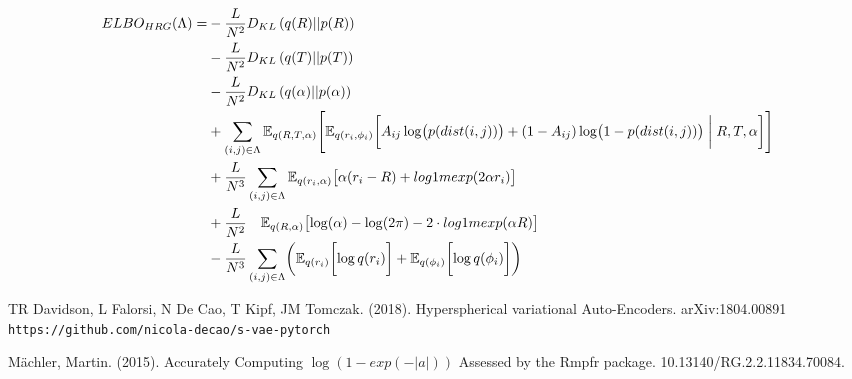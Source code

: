 \documentclass{article}
\newcommand{\E}{\mathbb{E}}
\begin{document}
\begin{equation}
\begin{split}
ELBO_{HRG}(\Lambda) = &- \frac{L}{N^2} D_{KL} \left(q(R)||p(R)\right)\\
\quad &- \frac{L}{N^2} D_{KL} \left(q(T)||p(T)\right)\\
\quad &- \frac{L}{N^2} D_{KL} \left(q(\alpha)||p(\alpha)\right)\\
\quad & + \sum_{(i,j) \in \Lambda }\E_{q( R,T,\alpha)} \Biggl[ 
\E_{q(r_i, \phi_i)} \biggl[ 
A_{ij} \log \bigl(p(dist(i,j))\bigr) + (1-A_{ij}) \log \bigl(1 - p(dist(i,j))\bigr)  \biggm\vert R,T,\alpha \biggr] \Biggr]\\
\quad &+ \frac{L}{N^3} \sum_{(i,j) \in \Lambda} \E_{q(r_i, \alpha)} \bigl[ \alpha (r_i-R) + log1mexp (2 \alpha r_i) \bigr]\\
\quad &+ \frac{L}{N^2} \quad \E_{q(R, \alpha)} \bigl[ \log( \alpha ) - \log(2\pi) - 2\cdot log1mexp (\alpha R) \bigr]\\
\quad &- \frac{L}{N^3} \sum_{(i,j) \in \Lambda} \biggl(\E_{q(r_i)} \biggl[\log q(r_i) \biggr] + \E_{q(\phi_i)} \biggl[\log q(\phi_i) \biggr] \biggr) 
\end{split}
\end{equation} 

\begin{thebibliography}{}
	TR Davidson, L Falorsi, N De Cao, T Kipf, JM Tomczak. (2018). Hyperspherical variational Auto-Encoders. arXiv:1804.00891 \\
	\texttt{https://github.com/nicola-decao/s-vae-pytorch}
	
	M\"achler, Martin. (2015). Accurately Computing $\log(1 - exp(-|a|))$ Assessed by the Rmpfr package. 10.13140/RG.2.2.11834.70084. 	
	
	
\end{thebibliography}
\end{document}
